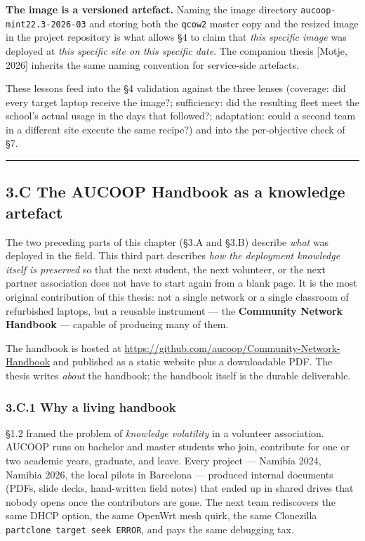 \textbf{The image is a versioned artefact.} Naming the image directory
\texttt{aucoop-mint22.3-2026-03} and storing both the \texttt{qcow2}
master copy and the resized image in the project repository is what
allows §4 to claim that \emph{this specific image} was deployed at
\emph{this specific site on this specific date}. The companion thesis
{[}Motje, 2026{]} inherits the same naming convention for service-side
artefacts.

These lessons feed into the §4 validation against the three lenses
(coverage: did every target laptop receive the image?; sufficiency: did
the resulting fleet meet the school's actual usage in the days that
followed?; adaptation: could a second team in a different site execute
the same recipe?) and into the per-objective check of §7.

\begin{center}\rule{0.5\linewidth}{0.5pt}\end{center}

\hypertarget{c-the-aucoop-handbook-as-a-knowledge-artefact}{%
\subsection{3.C The AUCOOP Handbook as a knowledge
artefact}\label{c-the-aucoop-handbook-as-a-knowledge-artefact}}

The two preceding parts of this chapter (§3.A and §3.B) describe
\emph{what} was deployed in the field. This third part describes
\emph{how the deployment knowledge itself is preserved} so that the next
student, the next volunteer, or the next partner association does not
have to start again from a blank page. It is the most original
contribution of this thesis: not a single network or a single classroom
of refurbished laptops, but a reusable instrument --- the
\textbf{Community Network Handbook} --- capable of producing many of
them.

The handbook is hosted at
\url{https://github.com/aucoop/Community-Network-Handbook} and published
as a static website plus a downloadable PDF. The thesis writes
\emph{about} the handbook; the handbook itself is the durable
deliverable.

\hypertarget{c.1-why-a-living-handbook}{%
\subsubsection{3.C.1 Why a living
handbook}\label{c.1-why-a-living-handbook}}

§1.2 framed the problem of \emph{knowledge volatility} in a volunteer
association. AUCOOP runs on bachelor and master students who join,
contribute for one or two academic years, graduate, and leave. Every
project --- Namibia 2024, Namibia 2026, the local pilots in Barcelona
--- produced internal documents (PDFs, slide decks, hand-written field
notes) that ended up in shared drives that nobody opens once the
contributors are gone. The next team rediscovers the same DHCP option,
the same OpenWrt mesh quirk, the same Clonezilla
\texttt{partclone\ target\ seek\ ERROR}, and pays the same debugging
tax.

